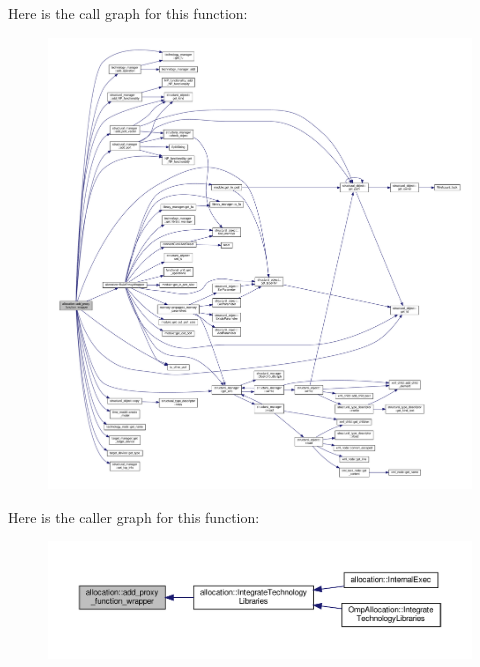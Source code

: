 Here is the call graph for this function\+:
\nopagebreak
\begin{figure}[H]
\begin{center}
\leavevmode
\includegraphics[width=350pt]{d0/d74/classallocation_afa7e3452b30f32920f34aaad4d3299ed_cgraph}
\end{center}
\end{figure}
Here is the caller graph for this function\+:
\nopagebreak
\begin{figure}[H]
\begin{center}
\leavevmode
\includegraphics[width=350pt]{d0/d74/classallocation_afa7e3452b30f32920f34aaad4d3299ed_icgraph}
\end{center}
\end{figure}
\mbox{\label{classallocation_a88280c4c0b8d9bd5cf61934cf43a0f7b}} 
